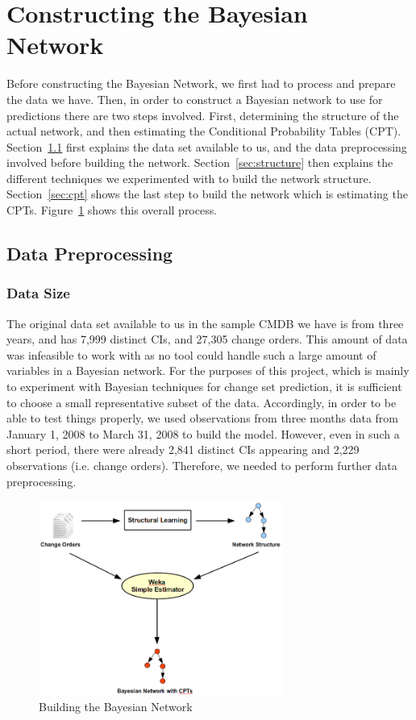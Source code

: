 \documentclass{article}
\begin{document}
\section{Constructing the Bayesian Network}
\label{sec:modelsused}

Before constructing the Bayesian Network, we first had to process and prepare the data we have. Then, in order to construct a Bayesian network to use for
predictions there are two steps involved. First, determining the structure of the actual network, and then estimating the Conditional Probability Tables
(CPT). Section~\ref{sec:data} first explains the data set available to us, and the data preprocessing involved before building the network.
Section~\ref{sec:structure} then explains the different techniques we experimented with to build the network structure. Section~\ref{sec:cpt} shows the last
step to build the network which is estimating the CPTs. Figure~\ref{fig:process} shows this overall process.

\subsection{Data Preprocessing}
\label{sec:data}

\subsubsection*{Data Size}
The original data set available to us in the sample CMDB we have is from three years, and has 7,999 distinct CIs, and 27,305 change orders. This amount of data
was infeasible to work with as no tool could handle such a large amount of variables in a Bayesian network. For the purposes of this project, which is mainly to
experiment with Bayesian techniques for change set prediction, it is sufficient to choose a small representative subset of the data. Accordingly, in order to be
able to test things properly, we used observations from three months data from January 1, 2008 to March 31, 2008 to build the model. However, even in such a
short period, there were already 2,841 distinct CIs appearing and 2,229 observations (i.e. change orders). Therefore, we needed to perform further data
preprocessing. 

\begin{figure}[!t]
\centering
\includegraphics[width=8cm]{graphics/constructingmodel.png}
\caption{Building the Bayesian Network}
\label{fig:process}
\end{figure}
\end{document}
